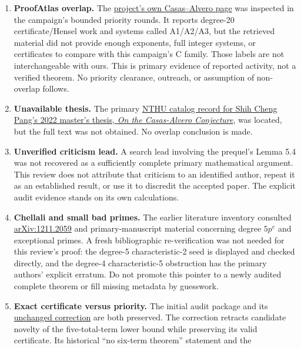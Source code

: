 \documentclass[
  british,
  10pt,
]{article}
\begin{document}
\begin{enumerate}
\def\labelenumi{\arabic{enumi}.}
\item
  \textbf{ProofAtlas overlap.} The
  \href{https://www.proofatlas.ai/collaboration/casas-alvero-conjecture/}{project's
  own Casas--Alvero page} was inspected in the campaign's bounded
  priority rounds. It reports degree-20 certificate/Hensel work and
  systems called A1/A2/A3, but the retrieved material did not provide
  enough exponents, full integer systems, or certificates to compare
  with this campaign's C family. Those labels are not interchangeable
  with ours. This is primary evidence of reported activity, not a
  verified theorem. No priority clearance, outreach, or assumption of
  non-overlap follows.
\item
  \textbf{Unavailable thesis.} The primary
  \href{https://etd.lib.nycu.edu.tw/cgi-bin/gs32/hugsweb.cgi?o=dnthucdr&s=id\%3D\%22G021090215100\%22.&searchmode=basic}{NTHU
  catalog record for Shih Cheng Pang's 2022 master's thesis, \emph{On
  the Casas-Alvero Conjecture}}, was located, but the full text was not
  obtained. No overlap conclusion is made.
\item
  \textbf{Unverified criticism lead.} A search lead involving the
  prequel's Lemma 5.4 was not recovered as a sufficiently complete
  primary mathematical argument. This review does not attribute that
  criticism to an identified author, repeat it as an established result,
  or use it to discredit the accepted paper. The explicit audit evidence
  stands on its own calculations.
\item
  \textbf{Chellali and small bad primes.} The earlier literature
  inventory consulted
  \href{https://arxiv.org/abs/1211.2059}{arXiv:1211.2059} and
  primary-manuscript material concerning degree \(5p^e\) and exceptional
  primes. A fresh bibliographic re-verification was not needed for this
  review's proof: the degree-5 characteristic-2 seed is displayed and
  checked directly, and the degree-4 characteristic-5 obstruction has
  the primary authors' explicit erratum. Do not promote this pointer to
  a newly audited complete theorem or fill missing metadata by
  guesswork.
\item
  \textbf{Exact certificate versus priority.} The initial audit package
  and its \href{evidence/AUDIT_NOVELTY_CORRECTION.md}{unchanged
  correction} are both preserved. The correction retracts candidate
  novelty of the five-total-term lower bound while preserving its valid
  certificate. Its historical ``no six-term theorem'' statement and the

\end{enumerate}
\end{document}
